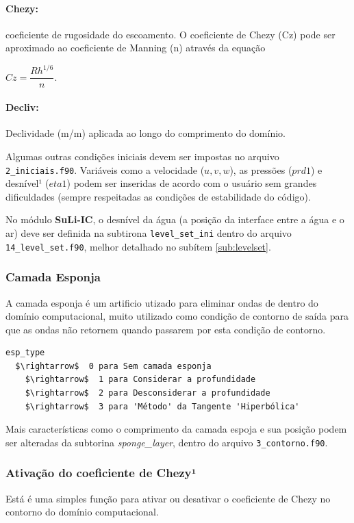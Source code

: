 \documentclass[12pt, a4paper]{article}
\newcommand{\SLIC}{{\bf SuLi-IC}}
\begin{document}
\paragraph{Chezy:} coeficiente de rugosidade do escoamento. O coeficiente de Chezy (Cz) pode ser aproximado ao coeficiente de Manning (n) através da equação

\begin{center}
$Cz = \dfrac{Rh^{1/6}}{n}.$
\end{center}

\paragraph{Decliv:} Declividade (m/m) aplicada ao longo do comprimento do domínio.
\linebreak

Algumas outras condições iniciais devem ser impostas no arquivo \verb|2_iniciais.f90|. Variáveis como a velocidade ($u,v,w$), as pressões ($prd1$) e desnível¹ ($eta1$)  podem ser inseridas de acordo com o usuário sem grandes dificuldades (sempre respeitadas as condições de estabilidade do código).

No módulo \SLIC, o desnível da água (a posição da interface entre a água e o ar) deve ser definida na subtirona \verb|level_set_ini| dentro do arquivo \verb|14_level_set.f90|, melhor detalhado no subítem \ref{sub:levelset}.


\subsubsection{Camada Esponja}

A camada esponja é um artificio utizado para eliminar ondas de dentro do domínio computacional, muito utilizado como condição de contorno de saída para que as ondas não retornem quando passarem por esta condição de contorno.

\begin{lstlisting}[escapeinside='']
esp_type
  $\rightarrow$  0 para Sem camada esponja
	$\rightarrow$  1 para Considerar a profundidade
	$\rightarrow$  2 para Desconsiderar a profundidade
	$\rightarrow$  3 para 'Método' da Tangente 'Hiperbólica'
\end{lstlisting}	

Mais características como o comprimento da camada espoja e sua posição podem ser alteradas da subtorina \textit{sponge\_layer}, dentro do arquivo \verb|3_contorno.f90|.


\subsubsection{Ativação do coeficiente de Chezy¹}
Está é uma simples função para ativar ou desativar o coeficiente de Chezy no contorno do domínio computacional.
	
\end{document}
